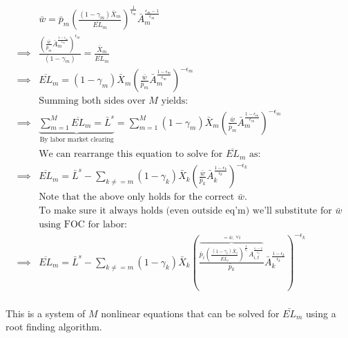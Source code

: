 \documentclass[letterpaper,12pt]{article}
\theoremstyle{definition}
\begin{document}
\begin{spacing}{1.5}
\begin{enumerate}
	\begin{equation}
	\begin{split}
	& \bar{w} = \bar{p}_{m}\left(\frac{(1-\gamma_{m})\bar{X}_{m}}{\overline{EL}_{m}}\right)^{\frac{1}{\epsilon_{m}}}\bar{A}_{m}^{\frac{\epsilon_{m}-1}{\epsilon_{m}}} \\
	\implies & \frac{\left(\frac{\bar{w}}{\bar{p}_{m}}\bar{A}_{m}^{\frac{1-\epsilon_{m}}{\epsilon_{m}}}\right)^{\epsilon_{m}}}{(1-\gamma_{m})} = \frac{\bar{X}_{m}}{\overline{EL}_{m}} \\
	\implies &  \overline{EL}_{m} = (1-\gamma_{m})\bar{X}_{m} \left(\frac{\bar{w}}{\bar{p}_{m}}\bar{A}_{m}^{\frac{1-\epsilon_{m}}{\epsilon_{m}}}\right)^{-\epsilon_{m}} \\
	& \text{Summing both sides over $M$ yields:} \\
	\implies &  \underbrace{\sum_{m=1}^{M} \overline{EL}_{m}= \bar{L}^{s}}_{\text{By labor market clearing}} =\sum_{m=1}^{M} (1-\gamma_{m})\bar{X}_{m} \left(\frac{\bar{w}}{\bar{p}_{m}}\bar{A}_{m}^{\frac{1-\epsilon_{m}}{\epsilon_{m}}}\right)^{-\epsilon_{m}} \\
	& \text{We can rearrange this equation to solve for $\overline{EL}_{m}$ as:}\\
	\implies & \overline{EL}_{m} = \bar{L}^{s} -\sum_{k \neq=m} (1- \gamma_{k})\bar{X}_{k} \left(\frac{\bar{w}}{\bar{p}_{k}}\bar{A}_{k}^{\frac{1-\epsilon_{k}}{\epsilon_{k}}}\right)^{-\epsilon_{k}}\\
	& \text{Note that the above only holds for the correct $\bar{w}$.  }\\
	& \text{To make sure it always holds (even outside eq'm) we'll substitute for $\bar{w}$} \\
	& \text{using FOC for labor:} \\
	\implies & \overline{EL}_{m} = \bar{L}^{s} -\sum_{k \neq=m} (1- \gamma_{k})\bar{X}_{k} \left(\frac{\overbrace{\bar{p}_{i}\left(\frac{(1-\gamma_{i})\bar{X}_{i}}{\overline{EL}_{i}}\right)^{\frac{1}{\epsilon_{i}}}A_{i,t}^{\frac{\epsilon_{i}-1}{\epsilon_{i}}}}^{=\bar{w}, \ \forall i}}{\bar{p}_{k}}\bar{A}_{k}^{\frac{1-\epsilon_{k}}{\epsilon_{k}}}\right)^{-\epsilon_{k}}\\
	\end{split}
	\end{equation}

	This is a system of $M$ nonlinear equations that can be solved for $\bar{EL}_{m}$ using a root finding algorithm.
	

\end{enumerate}
\end{spacing}
\end{document}

